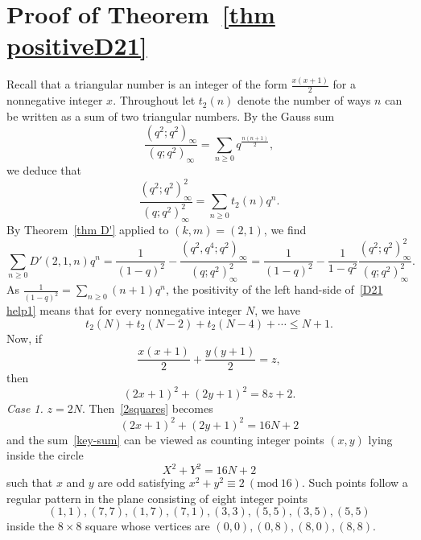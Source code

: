 \documentclass[reqno]{amsart}
\theoremstyle{definition}
\theoremstyle{plain}
\theoremstyle{remark}
\numberwithin{equation}{section}
\newcommand{\Mod}[1]{\ (\mathrm{mod}\ #1)}
\newcommand{\fr}{\frac}
\begin{document}
\section{Proof of Theorem~\ref{thm positiveD21}}\label{sec proof thm positiveD21}
%
Recall that a triangular number is an integer of the form $\fr{x(x+1)}{2}$ for a nonnegative integer $x$.
Throughout let
$t_2(n)$  denote the number of ways $n$ can be written as a sum of two triangular numbers.
By the Gauss sum~\cite{Andrews}
\[
\fr{(q^2;q^2)_\infty}{(q;q^2)_\infty} = \sum_{n\geq 0}q^{\fr{n(n+1)}{2}},
\]
we deduce that
\begin{equation}\label{t2-generating}
\fr{(q^2;q^2)_\infty^2}{(q;q^2)_\infty^2} = \sum_{n\geq 0} t_2(n) q^n.
\end{equation}
By Theorem~\ref{thm D'} applied to $(k,m)=(2,1)$, we find
\begin{equation}\label{D21 help1}
\sum_{n\geq 0}D'(2,1,n) q^n = \fr{1}{(1-q)^2}-\fr{(q^2,q^4;q^2)_\infty}{(q;q^2)_\infty^2}
= \fr{1}{(1-q)^2}-\fr{1}{1-q^2}\fr{(q^2;q^2)_\infty^2}{(q;q^2)_\infty^2}.
\end{equation}
As $\fr{1}{(1-q)^2}= \sum_{n\geq 0} (n+1)q^n$, the positivity of the left hand-side of~\eqref{D21 help1}
means that for every nonnegative integer $N$, we have
\begin{equation}\label{key-sum}
t_2(N)+t_2(N-2) + t_2(N-4) +\cdots \leq N+1.
\end{equation}
Now, if
\[
\fr{x(x+1)}{2} + \fr{y(y+1)}{2} =z,
\]
then
\begin{equation}\label{2squares}
(2x+1)^2 + (2y+1)^2 = 8z+2.
\end{equation}
\emph{Case 1.} $z=2N$. Then~\eqref{2squares} becomes
\[
(2x+1)^2 + (2y+1)^2 = 16N+2
\]
and the sum~\eqref{key-sum} can be viewed as counting integer points $(x,y)$ lying inside the circle
\begin{equation}\label{circle-1}
X^2 + Y^2 = 16N+2
\end{equation}
such that $x$ and $y$ are odd satisfying $x^2+y^2\equiv 2\Mod{16}$.
Such points follow a regular pattern in the plane consisting of eight integer points
\begin{equation}\label{eight-1}
(1,1),(7,7),(1,7),(7,1), (3,3), (5,5), (3,5),(5,5)
\end{equation}
inside the $8\times 8$ square whose vertices are $(0,0),(0,8),(8,0),(8,8)$.
\end{document}

